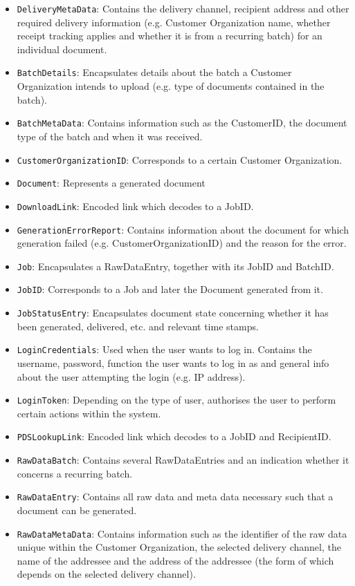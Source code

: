 \documentclass[a4paper,10pt]{article}
\begin{document}
\begin{itemize}
	\item \texttt{DeliveryMetaData}: Contains the delivery channel, recipient address and other required delivery information (e.g. Customer Organization name, whether receipt tracking applies and whether it is from a recurring batch) for an individual document.
	\item \texttt{BatchDetails}: Encapsulates details about the batch a Customer Organization intends to upload (e.g. type of documents contained in the batch).
	\item \texttt{BatchMetaData}: Contains information such as the CustomerID, the document type of the batch and when it was received.
	\item \texttt{CustomerOrganizationID}: Corresponds to a certain Customer Organization.
	\item \texttt{Document}: Represents a generated document
	\item \texttt{DownloadLink}: Encoded link which decodes to a JobID.
	\item \texttt{GenerationErrorReport}: Contains information about the document for which generation failed (e.g. CustomerOrganizationID) and the reason for the error.
	\item \texttt{Job}: Encapsulates a RawDataEntry, together with its JobID and BatchID.
	\item \texttt{JobID}: Corresponds to a Job and later the Document generated from it.
	\item \texttt{JobStatusEntry}: Encapsulates document state concerning whether it has been generated, delivered, etc. and relevant time stamps.
    \item \texttt{LoginCredentials}: Used when the user wants to log in. Contains the username, password, function the user wants to log in as and general info about the user attempting the login (e.g. IP address).
    \item \texttt{LoginToken}: Depending on the type of user, authorises the user to perform certain actions within the system.
    \item \texttt{PDSLookupLink}: Encoded link which decodes to a JobID and RecipientID.
    \item \texttt{RawDataBatch}: Contains several RawDataEntries and an indication whether it concerns a recurring batch. 
    \item \texttt{RawDataEntry}: Contains all raw data and meta data necessary such that a document can be generated.
    \item \texttt{RawDataMetaData}: Contains information such as the identifier of the raw data unique within the Customer Organization, the selected delivery channel, the name of the addressee and the address of the addressee (the form of which depends on the selected delivery channel).

\end{itemize}
\end{document}
